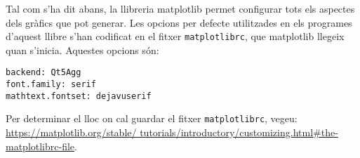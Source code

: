 Tal com s'ha dit abans, la llibreria matplotlib permet configurar tots els aspectes dels gràfics que pot generar. Les opcions per defecte utilitzades en els programes d'aquest llibre s'han codificat en el fitxer \texttt{matplotlibrc}, que matplotlib llegeix quan s'inicia. Aquestes opcions són:
\begin{lstlisting}
backend: Qt5Agg
font.family: serif
mathtext.fontset: dejavuserif
\end{lstlisting} 

Per determinar el lloc on cal guardar el fitxer \texttt{matplotlibrc}, vegeu: \href{https://matplotlib.org/stable/tutorials/introductory/customizing.html#the-matplotlibrc-file}{https://matplotlib.org/stable/ tutorials/introductory/customizing.html\#the-matplotlibrc-file}.

